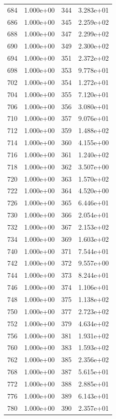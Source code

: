 \documentclass[12pt]{article}
\begin{document}
\begin{longtable}{@{}cccc@{}}
684 & 1.000e+00 & 344 & 3.283e+01 \\
686 & 1.000e+00 & 345 & 2.259e+02 \\
688 & 1.000e+00 & 347 & 2.299e+02 \\
690 & 1.000e+00 & 349 & 2.300e+02 \\
694 & 1.000e+00 & 351 & 2.372e+02 \\
698 & 1.000e+00 & 353 & 9.778e+01 \\
702 & 1.000e+00 & 354 & 1.272e+01 \\
704 & 1.000e+00 & 355 & 7.120e+01 \\
706 & 1.000e+00 & 356 & 3.080e+01 \\
710 & 1.000e+00 & 357 & 9.076e+01 \\
712 & 1.000e+00 & 359 & 1.488e+02 \\
714 & 1.000e+00 & 360 & 4.155e+00 \\
716 & 1.000e+00 & 361 & 1.240e+02 \\
718 & 1.000e+00 & 362 & 3.507e+00 \\
720 & 1.000e+00 & 363 & 1.570e+02 \\
722 & 1.000e+00 & 364 & 4.520e+00 \\
726 & 1.000e+00 & 365 & 6.446e+01 \\
730 & 1.000e+00 & 366 & 2.054e+01 \\
732 & 1.000e+00 & 367 & 2.153e+02 \\
734 & 1.000e+00 & 369 & 1.603e+02 \\
740 & 1.000e+00 & 371 & 7.544e+01 \\
742 & 1.000e+00 & 372 & 9.557e+00 \\
744 & 1.000e+00 & 373 & 8.244e+01 \\
746 & 1.000e+00 & 374 & 1.106e+01 \\
748 & 1.000e+00 & 375 & 1.138e+02 \\
750 & 1.000e+00 & 377 & 2.723e+02 \\
752 & 1.000e+00 & 379 & 4.634e+02 \\
756 & 1.000e+00 & 381 & 1.931e+02 \\
760 & 1.000e+00 & 383 & 1.593e+02 \\
762 & 1.000e+00 & 385 & 2.356e+02 \\
768 & 1.000e+00 & 387 & 5.615e+01 \\
772 & 1.000e+00 & 388 & 2.885e+01 \\
776 & 1.000e+00 & 389 & 6.143e+01 \\
780 & 1.000e+00 & 390 & 2.357e+01 \\

\end{longtable}
\end{document}
